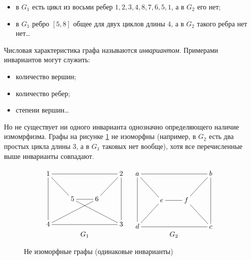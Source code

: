 \begin{itemize}
    \item в $G_1$ есть цикл из восьми ребер $1,2,3,4,8,7,6,5,1$, а в $G_2$ его нет;
    \item в $G_1$ ребро $[5,8]$ общее для двух циклов длины $4$, а в $G_2$ такого ребра нет нет\ldots
\end{itemize}

Числовая характеристика графа называются \emph{инвариантом}. Примерами инвариантов могут служить:
\begin{itemize}
    \item количество вершин;
    \item количество ребер;
    \item степени вершин\ldots
\end{itemize}

Но не существует ни одного инварианта однозначно определяющего наличие измомрфизма. Графы на рисунке \ref{fig:graph:nonIzomorphic6} не изоморфны (например, в $G_2$ есть два простых цикла длины $3$, а в $G_1$ таковых нет вообще), хотя все перечисленные выше инварианты совпадают.
\begin{figure}
    \[
        \begin{tabular}{cc}
        {\xymatrix{
            1 \ar@{-}[rrr] \ar@{-}[dd] \ar@{-}[dr]
                &*{}
                    &*{}
                        &2 \ar@{-}[dd] \ar@{-}[dl]
                            \\
            *{}
                &5 \ar@{-}[r] \ar@{-}[drr]
                    &6 \ar@{-}[dll]
                        &*{}
                            \\
            4 
                &*{}
                    &*{}
                        &3 \ar@{-}[lll]
        }}
        &
        {\xymatrix{
            a \ar@{-}[rrr] \ar@{-}[dd] \ar@{-}[dr]
                &*{}
                    &*{}
                        &b \ar@{-}[dd] \ar@{-}[dl]
                            \\
            *{}
                &e \ar@{-}[r] \ar@{-}[dl]
                    &f \ar@{-}[dr]
                        &*{}
                            \\
            d 
                &*{}
                    &*{}
                        &c \ar@{-}[lll]
        }}
        \\
        $G_1$&$G_2$
        \end{tabular}
    \]
    \caption{Не изоморфные графы (одинаковые инварианты)}
    \label{fig:graph:nonIzomorphic6}
\end{figure}

